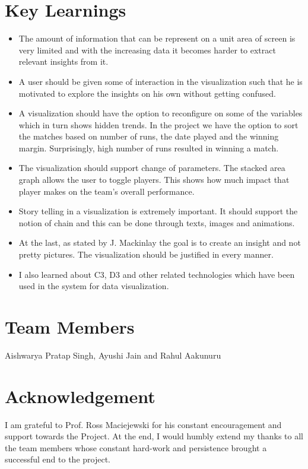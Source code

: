 \documentclass[letterpaper, 10 pt, conference]{ieeeconf}  %
\begin{document}
\section{Key Learnings}
\begin{itemize}
\item The amount of information that can be represent on a unit area of screen is very limited and with the increasing data it becomes harder to extract relevant insights from it.
\item A user should be given some of interaction in the visualization such that he is motivated to explore the insights on his own without getting confused.
\item A visualization should have the option to reconfigure on some of the variables which in turn shows hidden trends. In the project we have the option to sort the matches based on number of runs, the date played and the winning margin. Surprisingly, high number of runs resulted in winning a match.
\item The visualization should support change of parameters. The stacked area graph allows the user to toggle players. This shows how much impact that player makes on the team's overall performance.
\item Story telling in a visualization is extremely important. It should support the notion of chain and this can be done through texts, images and animations.
\item At the last, as stated by J. Mackinlay\cite{mackinlay} the goal is to create an insight and not pretty pictures. The visualization should be justified in every manner.
\item I also learned about C3, D3 and other related technologies which have been used in the system for data visualization.

\end{itemize}

\section{Team Members}
Aishwarya Pratap Singh, Ayushi Jain and Rahul Aakunuru

\section{Acknowledgement}
I am grateful to Prof. Ross Maciejewski for his constant encouragement and support towards the Project. At the end, I would humbly extend my thanks to all the team members whose constant hard-work and persistence brought a successful end to the project.
\end{document}
